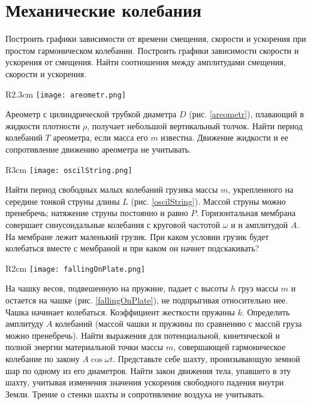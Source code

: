 \section{Механические колебания}
\AddProb Построить графики зависимости от времени смещения, скорости и ускорения при простом гармоническом колебании. Построить графики зависимости скорости и ускорения от смещения. Найти соотношения между амплитудами смещения, скорости и ускорения.

\begin{wrapfigure}[6]{R}{2.3cm}
\texttt{[image: areometr.png]}
\caption{}
\label{areometr}
\end{wrapfigure}
\AddProb Ареометр с цилиндрической трубкой диаметра $D$ (рис. \ref{areometr}), плавающий в жидкости плотности $\rho$, получает небольшой вертикальный толчок. Найти период колебаний $T$ ареометра, если масса его $m$ известна. Движение жидкости и ее сопротивление движению ареометра не учитывать.

\begin{wrapfigure}[8]{R}{3cm}
\texttt{[image: oscilString.png]}
\caption{}
\label{oscilString}
\end{wrapfigure}
\AddProb Найти период свободных малых колебаний грузика массы $m$,
укрепленного на середине тонкой струны длины $L$ (рис. \ref{oscilString}). Массой струны можно пренебречь; натяжение струны постоянно и равно $P$.
\AddProb Горизонтальная мембрана совершает синусоидальные колебания с круговой частотой $\omega$ и и амплитудой $A$. На мембране лежит маленький грузик. При каком условии грузик будет колебаться вместе с мембраной и при каком он начнет подскакивать?

\begin{wrapfigure}[11]{R}{2cm}
\texttt{[image: fallingOnPlate.png]}
\caption{}
\label{fallingOnPlate}
\end{wrapfigure}
\AddProb На чашку весов, подвешенную на пружине, падает с высоты $h$ груз массы $m$ и остается на чашке (рис. \ref{fallingOnPlate}), не подпрыгивая относительно нее. Чашка начинает колебаться. Коэффициент жесткости пружины $k$. Определить амплитуду $A$ колебаний (массой чашки и пружины по сравнению с массой груза можно пренебречь).
\AddProb Найти выражения для потенциальной, кинетической и полной энергии материальной точки массы $m$, совершающей гармоническое колебание по закону $A \cos \omega t$.
\AddProb Представьте себе шахту, пронизывающую земной шар по одному из его диаметров. Найти закон движения тела, упавшего в эту
шахту, учитывая изменения значения ускорения свободного падения
внутри Земли. Трение о стенки шахты и сопротивление воздуха не
учитывать.

